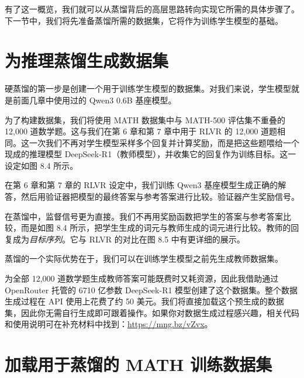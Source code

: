 
有了这一概览，我们就可以从蒸馏背后的高层思路转向实现它所需的具体步骤了。下一节中，我们将先准备蒸馏所需的数据集，它将作为训练学生模型的基础。

\section{为推理蒸馏生成数据集}

硬蒸馏的第一步是创建一个用于训练学生模型的数据集。对我们来说，学生模型就是前面几章中使用过的 Qwen3 0.6B 基座模型。

为了构建数据集，我们将使用 MATH 数据集中与 MATH-500 评估集不重叠的 12,000 道数学题。这与我们在第 6 章和第 7 章中用于 RLVR 的 12,000 道题相同。这一次我们不再对学生模型采样多个回复并计算奖励，而是把这些题喂给一个现成的推理模型 DeepSeek-R1（教师模型），并收集它的回复作为训练目标。这一设定如图 8.4 所示。


在第 6 章和第 7 章的 RLVR 设定中，我们训练 Qwen3 基座模型生成正确的解答，然后用验证器把模型的最终答案与参考答案进行比较。验证器产生奖励信号。

在蒸馏中，监督信号更为直接。我们不再用奖励函数把学生的答案与参考答案比较，而是如图 8.4 所示，把学生生成的词元与教师生成的词元进行比较。教师的回复成为\emph{目标序列}。它与 RLVR 的对比在图 8.5 中有更详细的展示。


蒸馏的一个实际优势在于，我们可以在训练学生模型之前先生成教师数据集。

为全部 12,000 道数学题生成教师答案可能既费时又耗资源，因此我借助通过 OpenRouter 托管的 6710 亿参数 DeepSeek-R1 模型创建了这个数据集。整个数据生成过程在 API 使用上花费了约 50 美元。我们将直接加载这个预生成的数据集，因此你无需自行生成即可跟着操作。如果你对数据生成过程感兴趣，相关代码和使用说明可在补充材料中找到：\href{https://mng.bz/vZvx}{https://mng.bz/vZvx}。

\section{加载用于蒸馏的 MATH 训练数据集}

